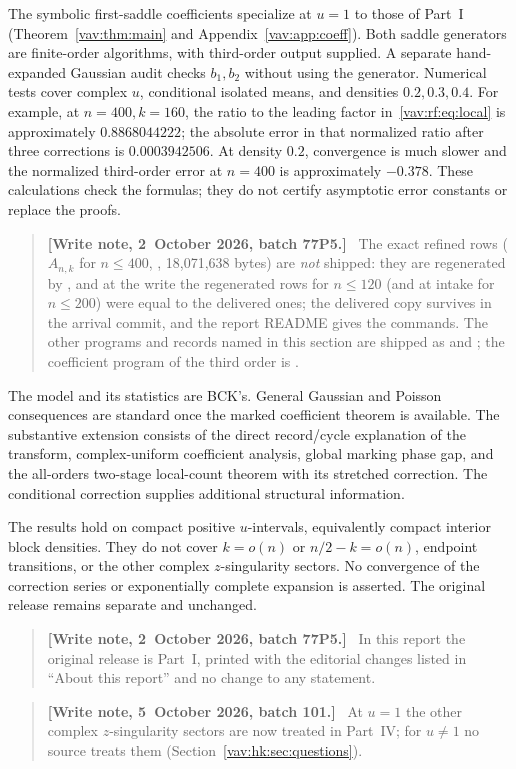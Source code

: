 \documentclass[11pt]{article}
\theoremstyle{remark}\newtheorem{remark}[theorem]{Remark}
\newenvironment{writenote}{\begin{quote}\small\raggedright\textbf{[Write note, 2~October 2026, batch 77P5.]}\ }{\end{quote}}
\newenvironment{writenoteb}{\begin{quote}\small\raggedright\textbf{[Write note, 5~October 2026, batch 101.]}\ }{\end{quote}}
\begin{document}
The symbolic first-saddle coefficients specialize at $u=1$ to those of Part~I (Theorem~\ref{vav:thm:main} and Appendix~\ref{vav:app:coeff}). Both saddle generators are finite-order algorithms, with third-order output supplied. A separate hand-expanded Gaussian audit checks $b_1,b_2$ without using the generator. Numerical tests cover complex $u$, conditional isolated means, and densities $0.2,0.3,0.4$. For example, at $n=400,k=160$, the ratio to the leading factor in~\eqref{vav:rf:eq:local} is approximately $0.8868044222$; the absolute error in that normalized ratio after three corrections is $0.0003942506$. At density $0.2$, convergence is much slower and the normalized third-order error at $n=400$ is approximately $-0.378$. These calculations check the formulas; they do not certify asymptotic error constants or replace the proofs.
\begin{writenote}
The exact refined rows ($A_{n,k}$ for $n\le400$, ,
18{,}071{,}638 bytes) are \emph{not} shipped: they are regenerated by
, and at the write the
regenerated rows for $n\le120$ (and at intake for $n\le200$) were equal to
the delivered ones; the delivered copy survives in the arrival commit, and
the report README gives the commands. The other programs and records named
in this section are shipped as  and
; the coefficient program of the third
order is .
\end{writenote}

The model and its statistics are BCK's. General Gaussian and Poisson consequences are standard once the marked coefficient theorem is available. The substantive extension consists of the direct record/cycle explanation of the transform, complex-uniform coefficient analysis, global marking phase gap, and the all-orders two-stage local-count theorem with its stretched correction. The conditional correction supplies additional structural information.

The results hold on compact positive $u$-intervals, equivalently compact interior block densities. They do not cover $k=o(n)$ or $n/2-k=o(n)$, endpoint transitions, or the other complex $z$-singularity sectors. No convergence of the correction series or exponentially complete expansion is asserted. The original release remains separate and unchanged.
\begin{writenote}
In this report the original release is Part~I, printed with the
editorial changes listed in ``About this report'' and no change to any
statement.
\end{writenote}
\begin{writenoteb}
At $u=1$ the other complex $z$-singularity sectors are now treated in
Part~IV; for $u\ne1$ no source treats them
(Section~\ref{vav:hk:sec:questions}).
\end{writenoteb}
\end{document}
